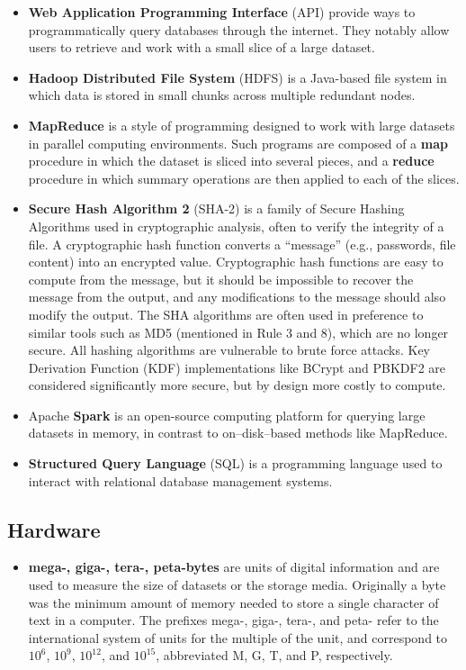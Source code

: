 \documentclass[10pt,letterpaper]{article}
\providecommand{\tightlist}{%
  \setlength{\itemsep}{0pt}\setlength{\parskip}{0pt}
}
\begin{document}
\begin{itemize}
\item
  \textbf{Web Application Programming Interface} (API) provide ways to
  programmatically query databases through the internet. They notably
  allow users to retrieve and work with a small slice of a large
  dataset.
\item
  \textbf{Hadoop Distributed File System} (HDFS) is a Java-based file
  system in which data is stored in small chunks across multiple
  redundant nodes.
\item
  \textbf{MapReduce} is a style of programming designed to work with
  large datasets in parallel computing environments. Such programs are
  composed of a \textbf{map} procedure in which the dataset is sliced
  into several pieces, and a \textbf{reduce} procedure in which summary
  operations are then applied to each of the slices.
\item
  \textbf{Secure Hash Algorithm 2} (SHA-2) is a family of Secure Hashing
  Algorithms used in cryptographic analysis, often to verify the
  integrity of a file. A cryptographic hash function converts a
  ``message'' (e.g., passwords, file content) into an encrypted value.
  Cryptographic hash functions are easy to compute from the message, but
  it should be impossible to recover the message from the output, and
  any modifications to the message should also modify the output. The
  SHA algorithms are often used in preference to similar tools such as
  MD5 (mentioned in Rule 3 and 8), which are no longer secure. All
  hashing algorithms are vulnerable to brute force attacks. Key
  Derivation Function (KDF) implementations like BCrypt and PBKDF2 are
  considered significantly more secure, but by design more costly to
  compute.
\item
  Apache \textbf{Spark} is an open-source computing platform for
  querying large datasets in memory, in contrast to on--disk--based
  methods like MapReduce.
\item
  \textbf{Structured Query Language} (SQL) is a programming language
  used to interact with relational database management systems.
\end{itemize}

\subsection*{Hardware}\label{hardware}

\begin{itemize}
\tightlist
\item
  \textbf{mega-, giga-, tera-, peta-bytes} are units of digital
  information and are used to measure the size of datasets or the
  storage media. Originally a byte was the minimum amount of memory
  needed to store a single character of text in a computer. The prefixes
  mega-, giga-, tera-, and peta- refer to the international system of
  units for the multiple of the unit, and correspond to \(10^{6}\),
  \(10^{9}\), \(10^{12}\), and \(10^{15}\), abbreviated M, G, T, and P,
  respectively.
\end{itemize}
\end{document}
